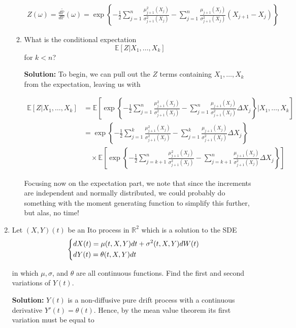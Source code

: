 \documentclass[12pt, a4paper]{article}
\begin{document}
\begin{enumerate}
\begin{enumerate}
        \begin{align*}
            Z(\omega) = \frac{d \tilde{\mathbb P}}{d \mathbb P}(\omega) = \exp \left\{ -\frac{1}{2} \sum_{j=1}^n \frac{\mu_{j+1}^2(X_j)}{\sigma_{j+1}^2(X_j)} - \sum_{j=1}^n \frac{\mu_{j+1}(X_j)}{\sigma_{j+1}^2(X_j)} (X_{j+1}-X_j)\right\}
        \end{align*}

        \item What is the conditional expectation $$\mathbb E[Z|X_1, \dots, X_k]$$
        for $k<n$?

        \textbf{Solution:} To begin, we can pull out the $Z$ terms containing $X_1, \dots, X_k$ from the expectation, leaving us with

        \begin{align*}
            \mathbb E[Z| X_1, \dots, X_k] &= \mathbb E \left[\exp \left\{ -\frac{1}{2} \sum_{j=1}^n \frac{\mu_{j+1}^2(X_j)}{\sigma_{j+1}^2(X_j)} - \sum_{j=1}^n \frac{\mu_{j+1}(X_j)}{\sigma_{j+1}^2(X_j)} \Delta X_j\right\} \Bigg| X_1, \dots, X_k \right]\\
            &= \exp \left\{ -\frac{1}{2} \sum_{j=1}^k \frac{\mu_{j+1}^2(X_j)}{\sigma_{j+1}^2(X_j)} - \sum_{j=1}^k \frac{\mu_{j+1}(X_j)}{\sigma_{j+1}^2(X_j)} \Delta X_j\right\}\\
            &\quad \times \mathbb E \left[\exp \left\{ -\frac{1}{2} \sum_{j=k+1}^n \frac{\mu_{j+1}^2(X_j)}{\sigma_{j+1}^2(X_j)} - \sum_{j=k+1}^n \frac{\mu_{j+1}(X_j)}{\sigma_{j+1}^2(X_j)} \Delta X_j\right\} \right]
        \end{align*}

        Focusing now on the expectation part, we note that since the increments are independent and normally distributed, we could probably do something with the moment generating function to simplify this further, but alas, no time!

    \end{enumerate}

    \item Let $(X,Y)(t)$ be an Ito process in $\mathbb R^2$ which is a solution to the SDE $$\begin{dcases} dX(t) = \mu(t,X,Y)dt + \sigma^2(t,X,Y)dW(t) \\ dY(t) = \theta(t,X,Y)dt \end{dcases}$$
    
    in which $\mu, \sigma$, and $\theta$ are all continuous functions. Find the first and second variations of $Y(t)$.

    \textbf{Solution:} $Y(t)$ is a non-diffusive pure drift process with a continuous derivative $Y'(t) = \theta(t)$. Hence, by the mean value theorem its first variation must be equal to 


\end{enumerate}
\end{document}
